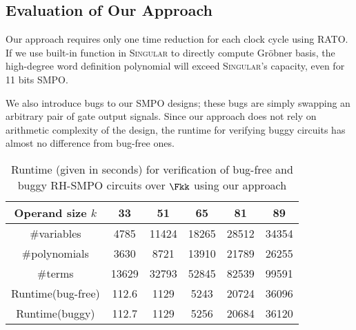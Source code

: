 \subsection{Evaluation of Our Approach}
Our approach requires only one time reduction for each clock cycle using RATO. If we use built-in function in \textsc{Singular} to directly
compute Gr\"obner basis, the high-degree word definition polynomial will exceed \textsc{Singular}'s capacity, even for 11 bits SMPO.

We also introduce bugs to our SMPO designs; these bugs are simply swapping an arbitrary pair of gate output signals. Since our approach does not
rely on arithmetic complexity of the design, the runtime for verifying buggy circuits has almost no difference from bug-free ones.

\begin{table}[tb]
\centering
\caption{Runtime (given in seconds) for verification of bug-free and buggy RH-SMPO circuits over $\Fkk$ using our approach}
\begin{minipage}{8cm}
\def\arraystretch{1.5}\tabcolsep 2pt
\begin{tabular}{|c||c|c|c|c|c|} 
\hline
Operand size $k$ & 33 & 51 & 65 & 81 & 89 \\
\hline
\#variables & 4785 & 11424 & 18265 & 28512 & 34354\\
\hline
\#polynomials & 3630 & 8721 & 13910 & 21789 & 26255\\
\hline
\#terms & 13629 & 32793 & 52845 & 82539 & 99591 \\
\hline
\hline
Runtime(bug-free) & 112.6 & 1129 & 5243 & 20724 & 36096 \\
\hline
Runtime(buggy) & 112.7 & 1129 & 5256 & 20684 & 36120\\
\hline
\end{tabular}
\end{minipage}
\label{table:SMPO}  
\end{table}

